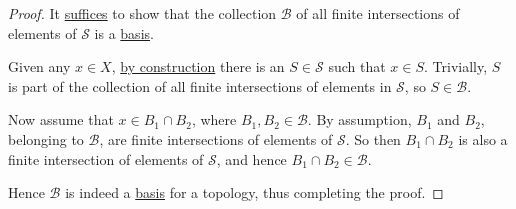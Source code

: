 \begin{proof}
  \def\B{\mathcal B}\def\S{\mathcal S}

  It \href{cd21899}{suffices} to show that the collection $\B$ of all finite
  intersections of elements of $\S$ is a \href{e896402}{basis}.

  Given any $x\in X$, \href{aba7b48}{by construction} there is an $S\in\S$ such
  that $x\in S$. Trivially, $S$ is part of the collection of all finite
  intersections of elements in $\S$, so $S\in\B$.

  Now assume that $x\in B_1\cap B_2$, where $B_1,B_2\in\B$. By assumption,
  $B_1$ and $B_2$, belonging to $\B$, are finite intersections of elements of
  $\S$. So then $B_1\cap B_2$ is also a finite intersection of elements of
  $\S$, and hence $B_1\cap B_2\in\B$.

  Hence $\B$ is indeed a \href{e896402}{basis} for a topology, thus completing
  the proof.
\end{proof}
